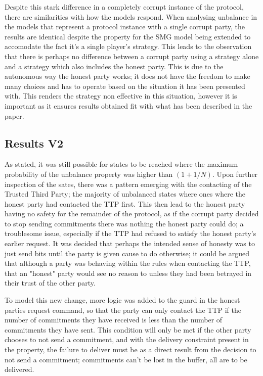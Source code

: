 \documentclass{l4proj}
\begin{document}
Despite this stark difference in a completely corrupt instance of the protocol, there are similarities with how the models respond. When analysing unbalance in the models that represent a protocol instance with a single corrupt party, the results are identical despite the property for the SMG model being extended to accomodate the fact it's a single player's strategy. This leads to the observation that there is perhaps no difference between a corrupt party using a strategy alone and a strategy which also includes the honest party. This is due to the autonomous way the honest party works; it does not have the freedom to make many choices and has to operate based on the situation it has been presented with. This renders the strategy non effective in this situation, however it is important as it ensures results obtained fit with what has been described in the paper.


\subsection{Results V2}

As stated, it was still possible for states to be reached where the maximum probability of the unbalance property was higher than $(1+1/ N)$. Upon further inspection of the sates, there was a pattern emerging with the contacting of the Trusted Third Party; the majority of unbalanced states where ones where the honest party had contacted the TTP first. This then lead to the honest party having no safety for the remainder of the protocol, as if the corrupt party decided to stop sending commitments there was nothing the honest party could do; a troublesome issue, especially if the TTP had refused to satisfy the honest party's earlier request. It was decided that perhaps the intended sense of honesty was to just send bits until the party is given cause to do otherwise; it could be argued that although a party was behaving within the rules when contacting the TTP, that an "honest" party would see no reason to unless they had been betrayed in their trust of the other party.

To model this new change, more logic was added to the guard in the honest parties request command, so that the party can only contact the TTP if the number of commitments they have received is less than the number of commitments they have sent. This condition will only be met if the other party chooses to not send a commitment, and with the delivery constraint present in the property, the failure to deliver must be as a direct result from the decision to not send a commitment; commitments can't be lost in the buffer, all are to be delivered.
\end{document}
